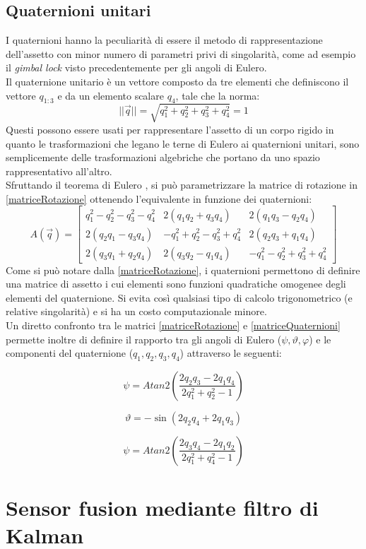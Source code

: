 \subsection{Quaternioni unitari}
I quaternioni hanno la peculiarità di essere il metodo di rappresentazione dell'assetto con minor numero di parametri privi di singolarità, come ad esempio il \textit{gimbal lock} visto precedentemente per gli angoli di Eulero.\\
Il quaternione unitario è un vettore composto da tre elementi che definiscono il vettore \textbf{$q_{1:3}$} e da un elemento scalare $q_4$, tale che la norma:
\begin{equation}
 ||\overrightarrow{q}|| = \sqrt{q_1^2 + q_2^2 + q_3^2 + q_4^2}=1
\end{equation}
Questi possono essere usati per rappresentare l'assetto di un corpo rigido in quanto le trasformazioni che legano le terne di Eulero ai quaternioni unitari, sono semplicemente delle trasformazioni algebriche che portano da uno spazio rappresentativo all'altro.\\
Sfruttando il teorema di Eulero \cite{assetto2}, si può parametrizzare la matrice di rotazione in \ref{matriceRotazione} ottenendo l'equivalente in funzione dei quaternioni:
\begin{equation}
\label{matriceQuaternioni}
A(\overrightarrow{q})= \begin{bmatrix}
 q_1^2 -  q_2^2 -  q_3^2 -  q_4^2 & 2(q_1 q_2 + q_3  q_4) & 2(q_1 q_3 - q_2 q_4) \\
2(q_2 q_1 - q_3 q_4)    &  -q_1^2 + q_2^2 -  q_3^2 +  q_4^2  & 2(q_2 q_3 + q_1q_4)\\
2(q_3 q_1 + q_2 q_4)    & 2(q_3 q_2 - q_1 q_4)  &  -q_1^2 -  q_2^2 +  q_3^2 +  q_4^2
\end{bmatrix}
\end{equation}
Come si può notare dalla \ref{matriceRotazione}, i quaternioni permettono di definire una matrice di assetto i cui elementi sono funzioni quadratiche omogenee degli elementi del quaternione. Si evita così qualsiasi tipo di calcolo trigonometrico (e relative singolarità) e si ha un costo computazionale minore.\\

Un diretto confronto tra le matrici \ref{matriceRotazione} e \ref{matriceQuaternioni} permette inoltre di definire il rapporto tra gli angoli di Eulero ($\psi,\vartheta,\varphi$) e le componenti del quaternione ($q_1, q_2, q_3,q_4$) attraverso le seguenti:

\begin{equation}
\psi = Atan2 \left( \frac{2q_2q_3 - 2q_1q_4}{2q_1^2+q_2^2 -1}\right)
\end{equation}

\begin{equation}
\vartheta = -\sin(2q_2q_4 + 2q_1q_3)
\end{equation}

\begin{equation}
\psi = Atan2\left(  \frac{2q_3 q_4 - 2q_1q_2}{2q_1^2+q_4^2 -1}\right)
\end{equation}


\section{Sensor fusion mediante  filtro di Kalman}
\label{sensor_fusion}
